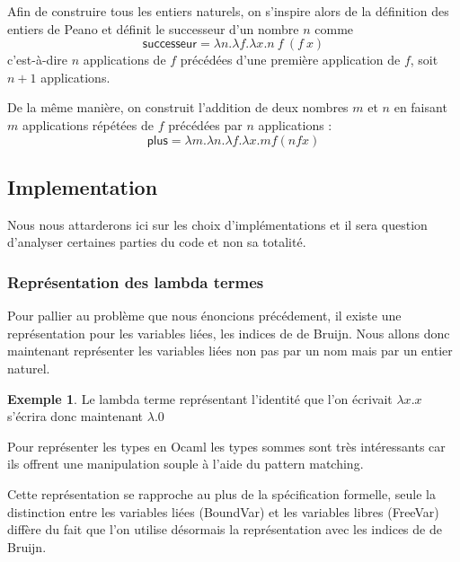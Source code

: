 \documentclass {article}
\newcommand{\codefrom}[3]
           {}
\theoremstyle{definition}
\newtheorem{example}{Exemple}
\theoremstyle{remark}
\begin{document}
Afin de construire tous les entiers naturels, on s'inspire alors de la
définition des entiers de Peano et définit le successeur d'un nombre \(n\)
comme
%
\[
\mathsf{successeur} = \lambda n. \lambda f. \lambda x. n\: f\: (f\: x)
\]
%
c'est-à-dire \(n\) applications de \(f\) précédées d'une première
application de \(f\), soit \(n+1\) applications.

De la même manière, on construit l'addition de deux nombres \(m\) et
\(n\) en faisant \(m\) applications répétées de \(f\) précédées par
\(n\) applications :
%
\[
\mathsf{plus} = \lambda m. \lambda n. \lambda f. \lambda x. m f (n f x)
\]


\subsection{Implementation}

Nous nous attarderons ici sur les choix d'implémentations et il sera question
d'analyser certaines parties du code et non sa totalité.

\subsubsection{Représentation des lambda termes}
 
Pour pallier au problème que nous énoncions précédement, il existe une 
représentation pour les variables liées, les indices de de Bruijn.
Nous allons donc maintenant représenter les variables liées non pas par un 
nom mais par un entier naturel. 

\begin{example}
  Le lambda terme représentant l'identité que l'on écrivait \(\lambda x.x\) s'écrira donc maintenant \(\lambda.0\)
\end{example}
Pour représenter les types en Ocaml les types sommes sont très intéressants car 
ils offrent une manipulation souple à l'aide du pattern matching.

\codefrom{untyped}{lambda}{untyped_term}

Cette représentation se rapproche au plus de la spécification formelle, seule la distinction entre les
variables liées (BoundVar) et les variables libres (FreeVar) diffère du fait que l'on utilise désormais 
la représentation avec les indices de de Bruijn.
\end{document}
